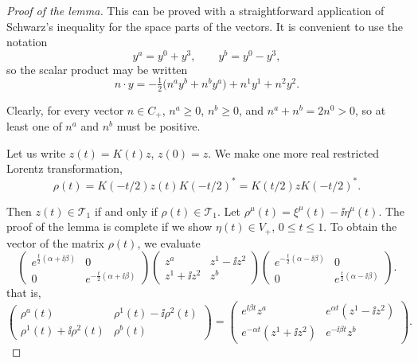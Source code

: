 \begin{proof}[Proof of the lemma]
This can be proved with a straightforward application of Schwarz's inequality
for the space parts of the vectors.  It is convenient to use the notation
\begin{equation*}
  y^a=y^0+y^3,\qquad y^b=y^0-y^3,
\end{equation*}
so the scalar product may be written
\begin{equation*}
  n\mathbin{\cdot}y
  =-\tfrac12\bigl(n^ay^b+n^by^a\bigr)+n^1y^1+n^2y^2 .
\end{equation*}

Clearly, for every vector $n\in C_{+}$, $n^a\geq0$, $n^b\geq0$, and
$n^a+n^b=2n^0>0$, so at least one of $n^a$ and $n^b$ must be positive.

Let us write $z(t)=K(t)z$, $z(0)=z$.  We make one more real restricted
Lorentz transformation,
\begin{equation*}
  \rho(t)=K(-t/2)z(t)K(-t/2)^*
  =K(t/2)zK(-t/2)^* .
\end{equation*}

Then $z(t)\in\mathcal{T}_{1}$ if and only if $\rho(t)\in\mathcal{T}_{1}$.
Let $\rho^{\mu}(t)=\xi^{\mu}(t)-\ii\eta^{\mu}(t)$.  The proof of the lemma is complete if we
show $\eta(t)\in V_{+}$, $0\leq t\leq1$.  To obtain the vector of the matrix
$\rho(t)$, we evaluate
\begin{equation*}
\begin{pmatrix}
 e^{\frac{t}{2}(\alpha+\ii\beta)}&0\\[2pt]
 0&e^{-\frac{t}{2}(\alpha+\ii\beta)}
\end{pmatrix}
\begin{pmatrix}
 z^a&z^1-\ii z^2\\[2pt]
 z^1+\ii z^2&z^b
\end{pmatrix}
\begin{pmatrix}
 e^{-\frac{t}{2}(\alpha-\ii\beta)}&0\\[2pt]
 0&e^{\frac{t}{2}(\alpha-\ii\beta)}
\end{pmatrix} .
\end{equation*}
that is,
\begin{equation*}
\begin{pmatrix}
 \rho^a(t)&\rho^1(t)-\ii\rho^2(t)\\[2pt]
 \rho^1(t)+\ii\rho^2(t)&\rho^b(t)
\end{pmatrix}
=
\begin{pmatrix}
 e^{\ii\beta t}z^a&e^{\alpha t}(z^1-\ii z^2)\\[2pt]
 e^{-\alpha t}(z^1+\ii z^2)&e^{-\ii\beta t}z^b
\end{pmatrix} .
\end{equation*}


\end{proof}
